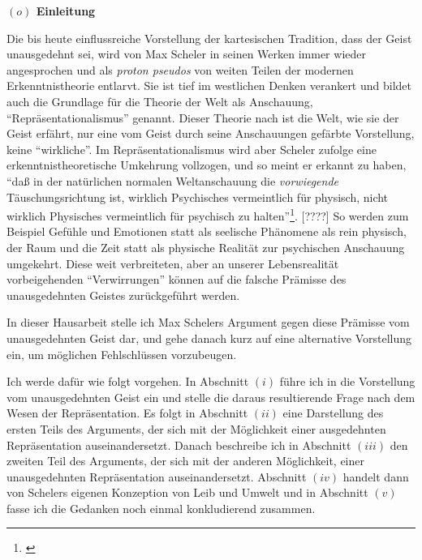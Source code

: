 \documentclass[a4paper, 12pt]{article}
\begin{document}
\begin{onehalfspace} 

\noindent\textbf{$(o)$ Einleitung}

\noindent Die bis heute einflussreiche Vorstellung der kartesischen Tradition, dass der Geist unausgedehnt sei, wird von Max Scheler in seinen Werken immer wieder angesprochen und als \emph{proton pseudos} von weiten Teilen der modernen Erkenntnistheorie entlarvt. Sie ist tief im westlichen Denken verankert und bildet auch die Grundlage für die Theorie der Welt als Anschauung, "`Repräsentationalismus"' genannt. Dieser Theorie nach ist die Welt, wie sie der Geist erfährt, nur eine vom Geist durch seine Anschauungen gefärbte Vorstellung, keine "`wirkliche"'. Im Repräsentationalismus wird aber Scheler zufolge eine erkenntnistheoretische Umkehrung vollzogen, und so meint er erkannt zu haben, "`daß in der natürlichen normalen Weltanschauung die \emph{vorwiegende} Täuschungsrichtung ist, wirklich Psychisches vermeintlich für physisch, nicht wirklich Physisches vermeintlich für psychisch zu halten"'\footnote{\Cite[Siehe][S. 257]{scheler-idole}}. [????] So werden zum Beispiel Gefühle und Emotionen statt als seelische Phänomene als rein physisch, der Raum und die Zeit statt als physische Realität zur psychischen Anschauung umgekehrt. Diese weit verbreiteten, aber an unserer Lebensrealität vorbeigehenden "`Verwirrungen"' können auf die falsche Prämisse des unausgedehnten Geistes zurückgeführt werden.

In dieser Hausarbeit stelle ich Max Schelers Argument gegen diese Prämisse vom unausgedehnten Geist dar, und gehe danach kurz auf eine alternative Vorstellung ein, um möglichen Fehlschlüssen vorzubeugen.


Ich werde dafür wie folgt vorgehen. In Abschnitt $(i)$ führe ich in die Vorstellung vom unausgedehnten Geist ein und stelle die daraus resultierende Frage nach dem Wesen der Repräsentation. Es folgt in Abschnitt $(ii)$ eine Darstellung des ersten Teils des Arguments, der sich mit der Möglichkeit einer ausgedehnten Repräsentation auseinandersetzt. Danach beschreibe ich in Abschnitt $(iii)$ den zweiten Teil des Arguments, der sich mit der anderen Möglichkeit, einer unausgedehnten Repräsentation auseinandersetzt. Abschnitt $(iv)$ handelt dann von Schelers eigenen Konzeption von Leib und Umwelt und in Abschnitt $(v)$ fasse ich die Gedanken noch einmal konkludierend zusammen.



\end{onehalfspace}
\end{document}
